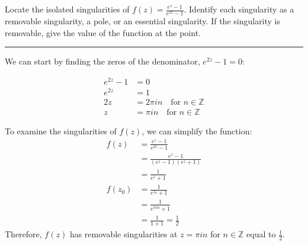 \begin{example}

    Locate the isolated singularities of \( f(z) = \frac{e^z - 1}{e^{2z} - 1} \). Identify each singularity as a removable singularity, a pole, or an essential singularity. If the singularity is removable, give the value of the function at the point.

    \hrule
    \vspace{0.5cm}

    We can start by finding the zeros of the denominator, $e^{2z} - 1 = 0$:

    \begin{align*}
        e^{2z} - 1 & = 0                                           \\
        e^{2z}     & = 1                                           \\
        2z         & = 2\pi i n \quad \text{for } n \in \mathbb{Z} \\
        z          & = \pi i n \quad \text{for } n \in \mathbb{Z}
    \end{align*}

    To examine the singularities of $f(z)$, we can simplify the function:
    \begin{align*}
        f(z)   & = \frac{e^z - 1}{e^{2z} - 1}         \\
               & = \frac{e^z - 1}{(e^z - 1)(e^z + 1)} \\
               & = \frac{1}{e^z + 1}                  \\
        f(z_0) & = \frac{1}{e^{z_0} + 1}              \\
               & = \frac{1}{e^{\pi i n} + 1}          \\
               & = \frac{1}{1 + 1} = \frac{1}{2}
    \end{align*}
    Therefore, $f(z)$ has removable singularities at $z = \pi i n$ for $n \in \mathbb{Z}$ equal to $\frac{1}{2}$.
\end{example}

